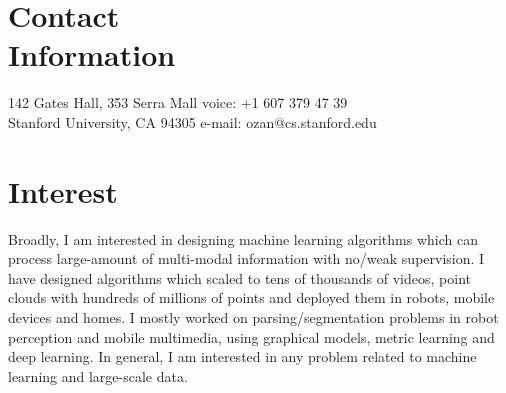 \documentclass[margin,line,10pt]{resume}
\begin{document}
\begin{resume}

    \section{\mysidestyle \textcolor{olgray}{Contact\\Information}}
    142 Gates Hall, 353 Serra Mall        \hfill voice: +1 607 379 47 39          \vspace{0mm}\\\vspace{0mm}%
    Stanford University, CA 94305 \hfill e-mail: ozan@cs.stanford.edu \vspace{0mm}\\\vspace{0mm}%


    \section{\mysidestyle \textcolor{olgray}{Interest}}
Broadly, I am interested in designing machine learning algorithms which can process large-amount of multi-modal information with no/weak supervision.  I have designed algorithms which scaled to tens of thousands of videos, point clouds with hundreds of millions of points and deployed them in robots, mobile devices and homes. I mostly worked on parsing/segmentation problems in robot perception and mobile multimedia, using graphical models, metric learning and deep learning. In general, I am interested in any problem related to machine learning and large-scale data.
    


\end{resume}
\end{document}
